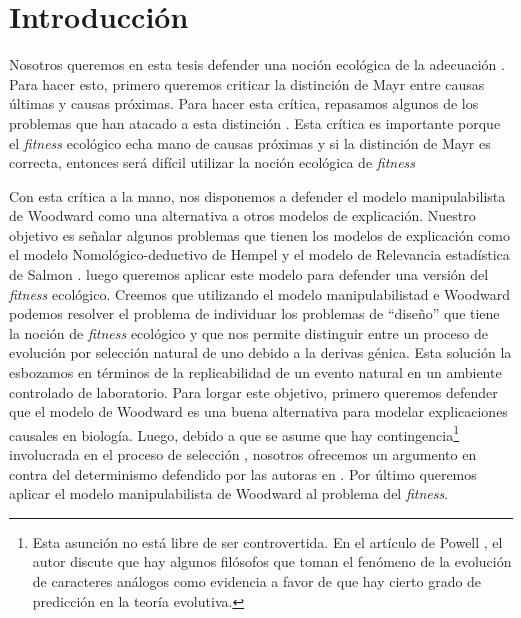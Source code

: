 
\chapter*{Introducción}


\noindent Nosotros queremos en esta tesis defender una noción ecológica de la adecuación \cite{sep-fitness, Bouchard2004}. Para hacer esto, primero queremos criticar la distinción de Mayr entre causas últimas y causas próximas. Para hacer esta crítica, repasamos algunos de los problemas que han atacado a esta distinción \cite{Laland2011, Uller2019}. Esta crítica es importante porque el \emph{fitness} ecológico echa mano de causas próximas y si la distinción de Mayr es correcta, entonces será difícil utilizar la noción ecológica de \emph{fitness}

Con esta crítica a la mano, nos disponemos a defender el modelo manipulabilista de Woodward \cite{Woodward2000, Woodward2003} como una alternativa a otros modelos de explicación. Nuestro objetivo es señalar algunos problemas que tienen los modelos de explicación como el modelo Nomológico-deductivo de Hempel y el modelo de Relevancia estadística de Salmon \cite{Salmon1970}. luego queremos aplicar este modelo para defender una versión del \emph{fitness} ecológico. Creemos que utilizando el modelo manipulabilistad e Woodward podemos resolver el problema de individuar los problemas de ``diseño''  que tiene la noción de \emph{fitness} ecológico \cite{Bouchard2004, sep-fitness} y que nos permite distinguir entre un proceso de evolución por selección natural de uno debido a la derivas génica. Esta solución la esbozamos en términos de la replicabilidad de un evento natural en un ambiente controlado de laboratorio. Para lorgar este objetivo, primero queremos defender que el modelo de Woodward es una buena alternativa para modelar explicaciones causales en biología. Luego, debido a que se asume que hay contingencia\footnote{Esta asunción no está libre de ser controvertida. En el artículo de Powell \citeyear{Powell2012}, el autor discute que hay algunos filósofos que toman el fenómeno de la evolución de caracteres análogos como evidencia a favor de que hay cierto grado de predicción en la teoría evolutiva.} involucrada en el proceso de selección \cite{Scriven1959, Mayr1998}, nosotros ofrecemos un argumento en contra del determinismo defendido por las autoras en \cite{Graves1999}. Por último queremos aplicar el modelo manipulabilista de Woodward al problema del \emph{fitness}.

